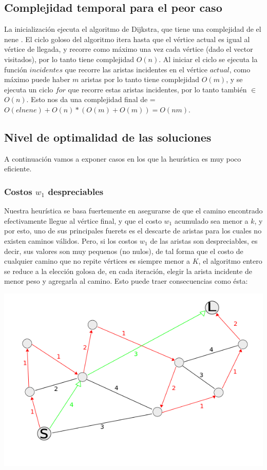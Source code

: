 \subsection{Complejidad temporal para el peor caso}

La inicializaci\'on ejecuta el algoritmo de Dijkstra, que tiene una complejidad de el nene . El ciclo goloso del algoritmo itera hasta que el v\'ertice actual es igual al v\'ertice de llegada, y recorre como m\'aximo una vez cada v\'ertice (dado el vector visitados), por lo tanto tiene complejidad $O(n)$. Al iniciar el ciclo se ejecuta la funci\'on $incidentes$ que recorre las aristas incidentes en el v\'ertice $actual$, como m\'aximo puede haber $m$ aristas por lo tanto tiene complejidad $O(m)$, y se ejecuta un ciclo $for$ que recorre estas aristas incidentes, por lo tanto tambi\'en $\in$ $O(n)$. Esto nos da una complejidad final de = $ O(el nene)+ O(n)*(O(m)+O(m)) = O(nm)$. 

\subsection{Nivel de optimalidad de las soluciones}

A continuaci\'on vamos a exponer casos en los que la heur\'istica es muy poco eficiente.
\subsubsection{Costos $w_1$ despreciables}

Nuestra heur\'istica se basa fuertemente en asegurarse de que el camino encontrado efectivamente llegue al v\'ertice final, y que el costo $w_1$ acumulado sea menor a $k$, y por esto, uno de sus principales fuerets es el descarte de aristas para los cuales no existen caminos v\'alidos. Pero, si los costos $w_1$ de las aristas son despreciables, es decir, sus valores son muy pequenos (no nulos), de tal forma que el costo de cualquier camino que no repite v\'ertices es siempre menor a $K$, el algoritmo entero se reduce a la elecci\'on golosa de, en cada iteraci\'on, elegir la arista incidente de menor peso y agregarla al camino. Esto puede traer consecuencias como \'esta:

\begin{center}
\includegraphics[scale=0.7]{grafoCaminoMasLargo.png}
\end{center}
\vspace{2mm}

